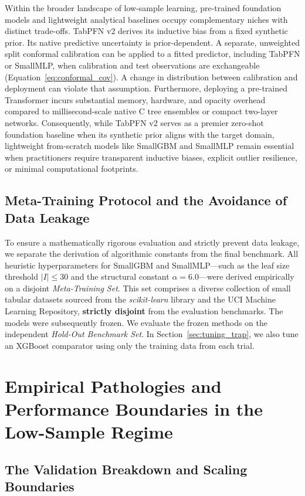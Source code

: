 \documentclass{article}
\begin{document}
Within the broader landscape of low-sample learning, pre-trained foundation models and lightweight analytical baselines occupy complementary niches with distinct trade-offs. TabPFN v2 derives its inductive bias from a fixed synthetic prior. Its native predictive uncertainty is prior-dependent. A separate, unweighted split conformal calibration can be applied to a fitted predictor, including TabPFN or SmallMLP, when calibration and test observations are exchangeable (Equation~\eqref{eq:conformal_cov}). A change in distribution between calibration and deployment can violate that assumption. Furthermore, deploying a pre-trained Transformer incurs substantial memory, hardware, and opacity overhead compared to millisecond-scale native C tree ensembles or compact two-layer networks. Consequently, while TabPFN v2 serves as a premier zero-shot foundation baseline when its synthetic prior aligns with the target domain, lightweight from-scratch models like SmallGBM and SmallMLP remain essential when practitioners require transparent inductive biases, explicit outlier resilience, or minimal computational footprints.

\subsection{Meta-Training Protocol and the Avoidance of Data Leakage}
\label{sec:meta_protocol}
To ensure a mathematically rigorous evaluation and strictly prevent data leakage, we separate the derivation of algorithmic constants from the final benchmark. All heuristic hyperparameters for SmallGBM and SmallMLP—such as the leaf size threshold $|I| \le 30$ and the structural constant $\alpha = 6.0$—were derived empirically on a disjoint \textit{Meta-Training Set}. This set comprises a diverse collection of small tabular datasets sourced from the \textit{scikit-learn} library and the UCI Machine Learning Repository, \textbf{strictly disjoint} from the evaluation benchmarks. The models were subsequently frozen. We evaluate the frozen methods on the independent \textit{Hold-Out Benchmark Set}. In Section~\ref{sec:tuning_trap}, we also tune an XGBoost comparator using only the training data from each trial.

\section{Empirical Pathologies and Performance Boundaries in the Low-Sample Regime}

\subsection{The Validation Breakdown and Scaling Boundaries}
\end{document}
